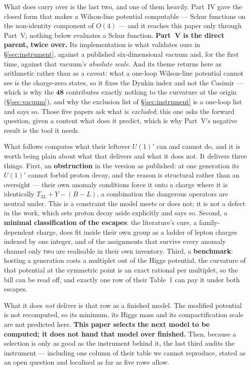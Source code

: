 \documentclass[11pt,a4paper]{article}
\newcommand{\rep}[1]{\mathbf{#1}}
\begin{document}
What does carry over is the last two, and one of them heavily. Part~IV gave the closed form that makes
a Wilson-line potential computable --- Schur functions on the non-identity component of $O(4)$
\cite{PartIV} --- and it reaches this paper only through Part~V; nothing below evaluates a Schur
function. \textbf{Part~V \cite{PartV} is the direct parent, twice over.} Its implementation is what validates ours
in \S\ref{sec:instrument}, against a published six-dimensional vacuum and, for the first time, against
that vacuum's \emph{absolute scale}. And its theme returns here as arithmetic rather than as a
caveat: what a one-loop Wilson-line potential cannot see is the charge-zero states, so it fixes the
Dynkin index and not the Casimir --- which is why the $\rep{48}$ contributes exactly nothing to the
curvature at the origin (\S\ref{sec:vacuum}), and why the exclusion list of \S\ref{sec:instrument} is
a one-loop list and says so. Those five papers ask what is \emph{excluded}; this one asks the forward
question, given a content what does it predict, which is why Part~V's negative result is the tool it
needs.

What follows computes what their leftover $U(1)'$ can and cannot do, and it is worth being plain
about what that delivers and what it does not. It delivers three things. First, an
\textbf{obstruction} in the version as published: at one generation its $U(1)'$ cannot forbid
proton decay, and the reason is structural rather than an oversight --- their own anomaly
conditions force it onto a charge where it is identically $T_{3L}+Y-(B-L)$, a combination the
dangerous operators are neutral under. This is a constraint the model meets or does not; it is not
a defect in the work, which sets proton decay aside explicitly and says so. Second, a \textbf{minimal
classification of the escapes}: the literature's cure, a family-dependent charge, does fit inside
their own group as a ladder of lepton charges indexed by one integer, and of the assignments that
survive every anomaly channel only two are realisable in their own inventory. Third, a
\textbf{benchmark}: hosting a generation costs a multiplet out of the Higgs potential, the curvature
of that potential at the symmetric point is an exact rational per multiplet, so the bill can be read
off, and exactly one row of their Table~1 can pay it under both escapes.

What it does \emph{not} deliver is that row as a finished model. The modified potential is not
recomputed, so its minimum, its Higgs mass and its compactification scale are not predicted here.
\textbf{This paper selects the next model to be computed; it does not hand that model over
finished.} Then, because a selection is only as good as the instrument behind it, the last third
audits the instrument --- including one column of their table we cannot reproduce, stated as an open
question and localised as far as five rows allow.
\end{document}
